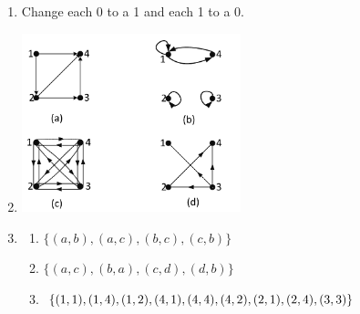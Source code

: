 \documentclass{../../cls/sig-alternate-05-2015}
\begin{document}
\begin{enumerate}
\item Change each 0
to a 1 and each 1 to a 0.

\item
	\includegraphics[width=0.5\textwidth]{figs/122.pdf}
	
\item
\begin{enumerate}
	\item $\{(a, b), (a, c), (b, c), (c, b)\}$
	\item $\{(a, c), (b, a), (c, d), (d, b)\}$
	\item $\{(1, 1), (1, 4), (1, 2), (4, 1), (4, 4),\\ (4, 2), (2, 1),
		(2, 4), (3, 3)\}$
\end{enumerate}

\end{enumerate}
\end{document}
